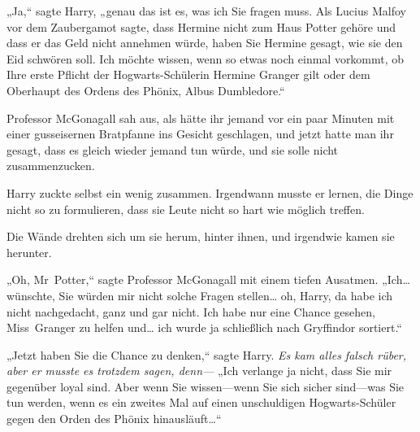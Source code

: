 „Ja,“ sagte Harry, „genau das ist es, was ich Sie fragen muss. Als Lucius Malfoy vor dem Zaubergamot sagte, dass Hermine nicht zum Haus Potter gehöre und dass er das Geld nicht annehmen würde, haben Sie Hermine gesagt, wie sie den Eid schwören soll. Ich möchte wissen, wenn so etwas noch einmal vorkommt, ob Ihre erste Pflicht der Hogwarts-Schülerin Hermine Granger gilt oder dem Oberhaupt des Ordens des Phönix, Albus Dumbledore.“

Professor McGonagall sah aus, als hätte ihr jemand vor ein paar Minuten mit einer gusseisernen Bratpfanne ins Gesicht geschlagen, und jetzt hatte man ihr gesagt, dass es gleich wieder jemand tun würde, und sie solle nicht zusammenzucken.

Harry zuckte selbst ein wenig zusammen. Irgendwann musste er lernen, die Dinge nicht so zu formulieren, dass sie Leute nicht so hart wie möglich treffen.

Die Wände drehten sich um sie herum, hinter ihnen, und irgendwie kamen sie herunter.

„Oh, Mr~Potter,“ sagte Professor McGonagall mit einem tiefen Ausatmen. „Ich… wünschte, Sie würden mir nicht solche Fragen stellen… oh, Harry, da habe ich nicht nachgedacht, ganz und gar nicht. Ich habe nur eine Chance gesehen, Miss~Granger zu helfen und… ich wurde ja schließlich nach Gryffindor sortiert.“

„Jetzt haben Sie die Chance zu denken,“ sagte Harry. \emph{Es kam alles falsch rüber, aber er musste es trotzdem sagen, denn—} „Ich verlange ja nicht, dass Sie mir gegenüber loyal sind. Aber wenn Sie wissen—wenn Sie sich sicher sind—was Sie tun werden, wenn es ein zweites Mal auf einen unschuldigen Hogwarts-Schüler gegen den Orden des Phönix hinausläuft…“

